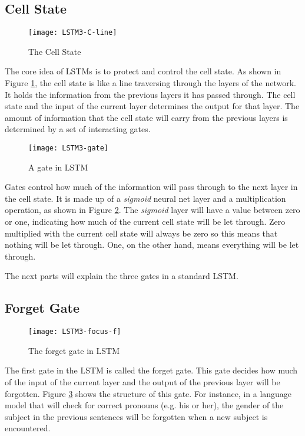     \subsection{Cell State}
        \begin{figure}[H]
        \centering
        \texttt{[image: LSTM3-C-line]}
        \caption{The Cell State \citep{olah2015understanding}}
        \label{fig:cell-state}
        \end{figure}
        The core idea of LSTMs is to protect and control the cell state. As shown in Figure \ref{fig:cell-state}, the cell state is like a line traversing through the layers of the network. It holds the information from the previous layers it has passed through. The cell state and the input of the current layer determines the output for that layer. The amount of information that the cell state will carry from the previous layers is determined by a set of interacting gates.

        \begin{figure}[H]
        \centering
        \texttt{[image: LSTM3-gate]}
        \caption{A gate in LSTM \citep{olah2015understanding}}
        \label{fig:lstm-gate}
        \end{figure}
        Gates control how much of the information will pass through to the next layer in the cell state. It is made up of a \textit{sigmoid} neural net layer and a multiplication operation, as shown in Figure \ref{fig:lstm-gate}. The \textit{sigmoid} layer will have a value between zero or one, indicating how much of the current cell state will be let through. Zero multiplied with the current cell state will always be zero so this means that nothing will be let through. One, on the other hand, means everything will be let through.

        The next parts will explain the three gates in a standard LSTM.

    \subsection{Forget Gate}
        \begin{figure}[H]
        \centering
        \texttt{[image: LSTM3-focus-f]}
        \caption{The forget gate in LSTM \citep{olah2015understanding}}
        \label{fig:lstm-forget-gate}
        \end{figure}
        The first gate in the LSTM is called the forget gate. This gate decides how much of the input of the current layer and the output of the previous layer will be forgotten. Figure \ref{fig:lstm-forget-gate} shows the structure of this gate. For instance, in a language model that will check for correct pronouns (e.g. his or her), the gender of the subject in the previous sentences will be forgotten when a new subject is encountered.

